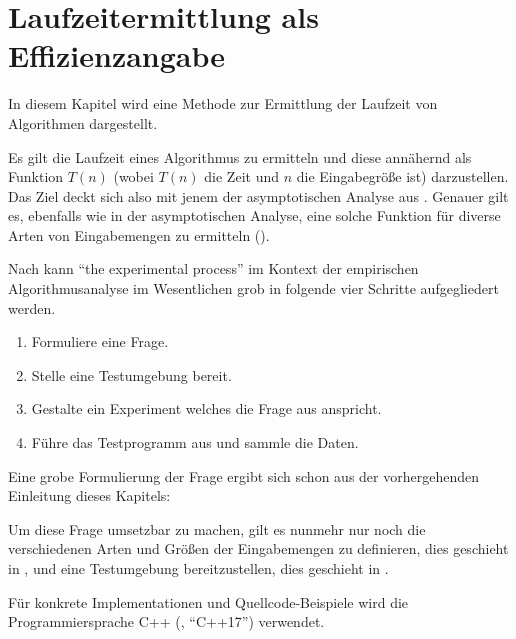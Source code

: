 \chapter{Laufzeitermittlung als Effizienzangabe}
\label{cha:praktische-effizienz}

In diesem Kapitel wird eine Methode zur Ermittlung der Laufzeit von Algorithmen dargestellt.

Es gilt die Laufzeit eines Algorithmus zu ermitteln und diese annähernd als Funktion $T(n)$ (wobei $T(n)$ die Zeit und $n$ die Eingabegröße ist) darzustellen. Das Ziel deckt sich also mit jenem der asymptotischen Analyse aus . Genauer gilt es, ebenfalls wie in der asymptotischen Analyse, eine solche Funktion für diverse Arten von Eingabemengen zu ermitteln (\cite[27]{mcg2012}).

Nach \cite[10]{mcg2012} kann \enquote{the experimental process} im Kontext der empirischen Algorithmusanalyse im Wesentlichen grob in folgende vier Schritte aufgegliedert werden.

\begin{enumerate}
     \item Formuliere eine Frage.\label{itm:experiment-formulate-question}
     \item Stelle eine Testumgebung bereit.\label{itm:experiment-environment}
     \item Gestalte ein Experiment welches die Frage aus  anspricht.
     \item Führe das Testprogramm aus und sammle die Daten.
 \end{enumerate}

Eine grobe Formulierung der Frage ergibt sich schon aus der vorhergehenden Einleitung dieses Kapitels:


Um diese Frage umsetzbar zu machen, gilt es nunmehr nur noch die verschiedenen Arten und Größen der Eingabemengen zu definieren, dies geschieht in , und eine Testumgebung bereitzustellen, dies geschieht in .

Für konkrete Implementationen und Quellcode-Beispiele wird die Programmiersprache C++ (\cite{ISO-C++17}, \enquote{C++17}) verwendet.


